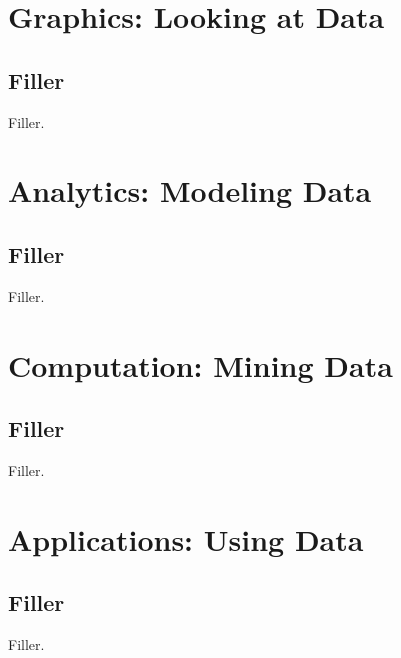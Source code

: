 \documentclass{book}
\begin{document}
\part{Graphics: Looking at Data}
\label{part:graphics}

\chapter{Filler}
Filler.

%
%
%
 
\part{Analytics: Modeling Data}
\label{part:analytics}

\chapter{Filler}
Filler.

%
%
%
%

\part{Computation: Mining Data}
\label{part:computation}

\chapter{Filler}
Filler.

%
%
%

\part{Applications: Using Data}
\label{part:applications}

\chapter{Filler}
Filler.

%
%
%



\appendix
%
%
%


\end{document}
